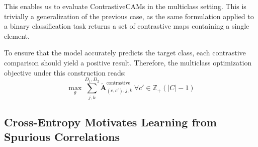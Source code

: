 \documentclass{article}
\theoremstyle{plain}
\theoremstyle{definition}
\theoremstyle{remark}
\begin{document}
This enables us to evaluate ContrastiveCAMs in the multiclass setting. This is trivially a generalization of the previous case, as the same formulation applied to a binary classification task returns a set of contrastive maps containing a single element.

To ensure that the model accurately predicts the target class, each contrastive comparison should yield a positive result. Therefore, the multiclass optimization objective under this construction reads:
\begin{equation}
	\max_{\theta} \sum^{D_1,D_2}_{j,k}\tilde{\mathcal{\bm{A}}}_{(c, c'),j,k}^{\text{contrastive}}\ \forall c' \in \mathbb{Z}_{+}(|C| - 1)
\end{equation}

\subsection{Cross-Entropy Motivates Learning from Spurious Correlations} \label{ce-motiv-spurious}
\end{document}
